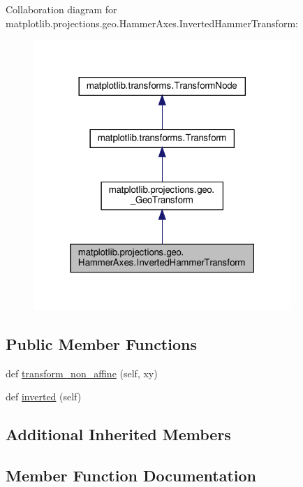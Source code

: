 Collaboration diagram for matplotlib.\+projections.\+geo.\+Hammer\+Axes.\+Inverted\+Hammer\+Transform\+:
\nopagebreak
\begin{figure}[H]
\begin{center}
\leavevmode
\includegraphics[width=277pt]{classmatplotlib_1_1projections_1_1geo_1_1HammerAxes_1_1InvertedHammerTransform__coll__graph}
\end{center}
\end{figure}
\subsection*{Public Member Functions}
\begin{DoxyCompactItemize}
\item 
def \hyperlink{classmatplotlib_1_1projections_1_1geo_1_1HammerAxes_1_1InvertedHammerTransform_a97e6c402eb3469e7c7d5bf9b2e8be685}{transform\+\_\+non\+\_\+affine} (self, xy)
\item 
def \hyperlink{classmatplotlib_1_1projections_1_1geo_1_1HammerAxes_1_1InvertedHammerTransform_ab75d607cae2ed24a9cacfc6fc6acb0d8}{inverted} (self)
\end{DoxyCompactItemize}
\subsection*{Additional Inherited Members}


\subsection{Member Function Documentation}
\mbox{\label{classmatplotlib_1_1projections_1_1geo_1_1HammerAxes_1_1InvertedHammerTransform_ab75d607cae2ed24a9cacfc6fc6acb0d8}} 
